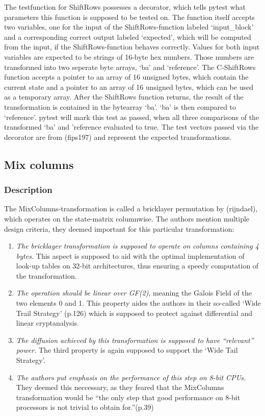 The testfunction for ShiftRows possesses a decorator, which tells pytest
what parameters this function is supposed to be tested on. The function
itself accepts two variables, one for the input of the
ShiftRows-function labeled `input\_block' and a corresponding correct
output labeled `expected', which will be computed from the input, if the
ShiftRows-function behaves correctly. Values for both input variables
are expected to be strings of 16-byte hex numbers. Those numbers are
transformed into two seperate byte arrays, `ba' and `reference'. The
C-ShiftRows function accepts a pointer to an array of 16 unsigned bytes,
which contain the current state and a pointer to an array of 16 unsigned
bytes, which can be used as a temporary array. After the ShiftRows
function returns, the result of the transformation is contained in the
bytearray `ba'. `ba' is then compared to `reference'. pytest will mark
this test as passed, when all three comparisons of the transformed `ba'
and 'reference evaluated to true. The test vectors passed via the
decorator are from (fips197) and represent the expected transformations.

\hypertarget{mix-columns}{%
\subsection{Mix columns}\label{mix-columns}}

\hypertarget{description-4}{%
\subsubsection{Description}\label{description-4}}

The MixColumns-transformation is called a bricklayer permutation by
(rijndael), which operates on the state-matrix columnwise. The authors
mention multiple design criteria, they deemed important for this
particular transformation:

\begin{enumerate}
\def\labelenumi{\arabic{enumi}.}

\item
  \emph{The bricklayer transformation is supposed to operate on columns
  containing 4 bytes.} This aspect is supposed to aid with the optimal
  implementation of look-up tables on 32-bit architectures, thus
  ensuring a speedy computation of the transformation.
\item
  \emph{The operation should be linear over GF(2)}, meaning the Galois
  Field of the two elements 0 and 1. This property aides the authors in
  their so-called `Wide Trail Strategy' (p.126) which is supposed to
  protect against differential and linear cryptanalysis.
\item
  \emph{The diffusion achieved by this transformation is supposed to
  have ``relevant'' power.} The third property is again supposed to
  support the `Wide Tail Strategy'.
\item
  \emph{The authors put emphasis on the performance of this step on 8-bit
  CPUs.} They deemed this neccessary, as they feared that the MixColumns
  transformation would be ``the only step that good performance on 8-bit
  processors is not trivial to obtain for.''(p.39)
\end{enumerate}


